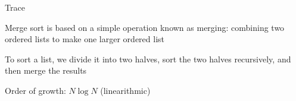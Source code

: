 \documentclass[8pt,a4paper,compress]{beamer}
\begin{document}
\begin{frame}[fragile]
\pause

Trace
\begin{center}
\end{center}
\end{frame}

\begin{frame}[fragile]
\pause

Merge sort is based on a simple operation known as merging: combining two ordered lists to make one larger ordered list

\pause
\bigskip

To sort a list, we divide it into two halves, sort the two halves recursively, and then merge the results

\begin{center}
\end{center}

\pause
\bigskip

Order of growth: $N \log N$ (linearithmic)
\end{frame}
\end{document}
